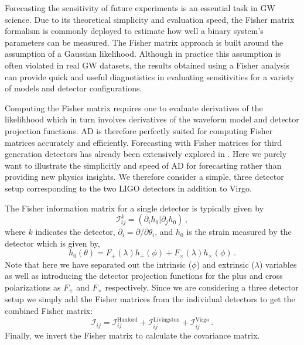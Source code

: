 \documentclass[twocolumn]{aastex631}
\begin{document}
Forecasting the sensitivity of future experiments is an essential task in GW science.
Due to its theoretical simplicity and evaluation speed, the Fisher matrix formalism is commonly deployed to estimate how well a binary system's parameters can be measured.
The Fisher matrix approach is built around the assumption of a Gaussian likelihood.
Although in practice this assumption is often violated in real GW datasets, the results obtained using a Fisher analysis can provide quick and useful diagnotistics in evaluating sensitivities for a variety of models and detector configurations.

Computing the Fisher matrix requires one to evaluate derivatives of the likelihhood which in turn involves derivatives of the waveform model and detector projection functions.
AD is therefore perfectly suited for computing Fisher matrices accurately and efficiently. 
Forecasting with Fisher matrices for third generation detectors has already been extensively explored in \citep{Iacovelli:2022bbs, Iacovelli:2022mbg}.
Here we purely want to illustrate the simplicitly and speed of AD for forecasting rather than providing new physics insights.
We therefore consider a simple, three detector setup corresponding to the two LIGO detectors in addition to Virgo.

The Fisher information matrix for a single detector is typically given by 
\begin{equation}
    \mathcal{I}^{k}_{ij} = (\partial_i h_0 | \partial_j h_0) \, ,
\end{equation}
where $k$ indicates the detector, $\partial_i = \partial/\partial \theta_i$, and $h_0$ is the strain measured by the detector which is given by,
\begin{equation}
    h_0(\theta) = F_+(\lambda) h_{+}(\phi) + F_\times(\lambda) h_{\times}(\phi) \, .
\end{equation}
Note that here we have separated out the intrinsic ($\phi$) and extrinsic ($\lambda$) variables as well as introducing the detector projection functions for the plus and cross polarizations as $F_+$ and $F_\times$ respectively.
Since we are considering a three detector setup we simply add the Fisher matrices from the individual detectors to get the combined Fisher matrix:
\begin{equation}
    \mathcal{I}_{ij} =  \mathcal{I}^{\mathrm{Hanford}}_{ij} + \mathcal{I}^{\mathrm{Livingston}}_{ij} + \mathcal{I}^{\mathrm{Virgo}}_{ij}   \, .
\end{equation}
Finally, we invert the Fisher matrix to calculate the covariance matrix.
\end{document}
